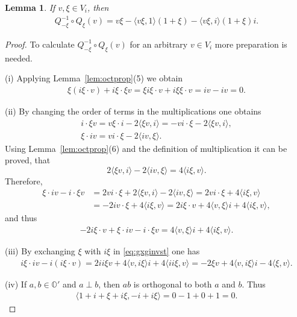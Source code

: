 \documentclass[pdftex]{sigma}
\numberwithin{equation}{section}
\newtheorem{Lemma}[Theorem]{Lemma}
\newcommand{\SO}{\mathbb{O}} %
\begin{document}
\begin{Lemma}\label{lemma3.7}
 If $v, \xi \in V_i$, then
 \begin{gather*}
 Q_{-\xi}^{-1}\circ Q_\xi(v)=v \xi- \langle v \xi,1\rangle(1+\xi)- \langle v\xi ,i\rangle(1+\xi)i.
 \end{gather*}
\end{Lemma}
\begin{proof}
 To calculate $Q_{-\xi}^{-1}\circ Q_\xi(v)$ for an arbitrary $v \in V_i$ more preparation is needed.

(i) Applying Lemma~\ref{lem:octprop}(5) we obtain
 \begin{gather}
 \xi(i\xi \cdot v)+i\xi \cdot \xi v=\xi i \xi \cdot v + i\xi \xi \cdot v=iv-iv=0. \label{eq:gxginvst1}
 \end{gather}

(ii) By changing the order of terms in the multiplications one obtains
 \begin{gather*} i \cdot \xi v = v\xi \cdot i -2 \langle \xi v,i \rangle = - vi\cdot \xi - 2 \langle\xi v,i \rangle ,\\
 \xi \cdot iv=vi\cdot\xi-2\langle i v,\xi \rangle. \end{gather*}
 Using Lemma~\ref{lem:octprop}(6) and the definition of multiplication it can be proved, that
 \[ 2 \langle \xi v,i \rangle -2 \langle iv,\xi \rangle=4 \langle i\xi,v\rangle. \]
 Therefore,
 \begin{align}
 \xi \cdot iv - i\cdot \xi v&= 2 vi\cdot \xi + 2 \langle \xi v,i \rangle -2 \langle iv,\xi \rangle=2 vi\cdot \xi + 4 \langle i\xi,v\rangle \nonumber\\
 &=-2iv\cdot\xi+ 4 \langle i\xi,v\rangle=2i\xi \cdot v+4\langle v,\xi \rangle i+ 4 \langle i\xi,v\rangle , \label{eq:gxginvst}
 \end{align}
 and thus
 \begin{gather}
 -2 i\xi \cdot v+ \xi \cdot iv-i\cdot \xi v=4 \langle v, \xi \rangle i+4 \langle i\xi,v\rangle. \label{eq:gxginvst2}
 \end{gather}

(iii) By exchanging $\xi$ with $i\xi$ in \eqref{eq:gxginvst} one has
 \begin{gather}
 i\xi \cdot iv-i(i\xi \cdot v)=2 ii\xi v+4 \langle v, i\xi \rangle i+ 4 \langle ii\xi,v \rangle=-2 \xi v +4 \langle v, i\xi \rangle i- 4 \langle\xi,v\rangle .\label{eq:gxginvst3}
 \end{gather}

(iv) If $a,b \in \SO'$ and $a\perp b$, then $ab$ is orthogonal to both $a$ and $b$. Thus
 \begin{gather}
 \langle 1+i+\xi+i\xi ,-i+i\xi\rangle=0-1+0+1=0. \label{eq:gxginvst4}
 \end{gather}


\end{proof}
\end{document}

